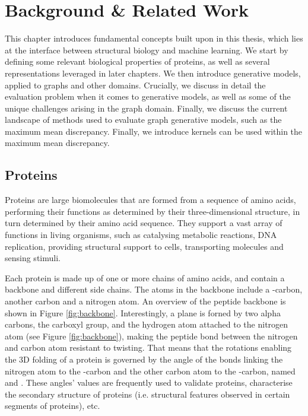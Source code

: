 
\chapter{Background \& Related Work}\label{chap:background}


This chapter introduces fundamental concepts built upon in this thesis, which
lies at the interface between structural biology and machine learning. We start
by defining some relevant biological properties of proteins, as well as several
representations leveraged in later chapters. We then introduce generative
models, applied to graphs and other domains. Crucially, we discuss in detail the
evaluation problem when it comes to generative models, as well as some of the
unique challenges arising in the graph domain. Finally, we discuss the current
landscape of methods used to evaluate graph generative models, such as the
maximum mean discrepancy. Finally, we introduce kernels can be used within the
maximum mean discrepancy.

\section{Proteins}\label{sec:proteins}

Proteins are large biomolecules that are formed from a sequence of amino acids,
performing their functions as determined by their three-dimensional structure,
in turn determined by their amino acid sequence. They support a vast array of
functions in living organisms, such as catalysing metabolic reactions, DNA
replication, providing structural support to cells, transporting molecules and
sensing stimuli.

Each protein is made up of one or more chains of amino acids, and contain a
backbone and different side chains. The atoms in the backbone include a
\textalpha{}-carbon, another carbon and a nitrogen atom. An overview of the
peptide backbone is shown in Figure \ref{fig:backbone}. Interestingly, a plane
is forned by two alpha carbons, the carboxyl group, and the hydrogen atom
attached to the nitrogen atom (see Figure \ref{fig:backbone}), making the
peptide bond between the nitrogen and carbon atom resistant to twisting. That
means that the rotations enabling the 3D folding of a protein is governed by the
angle of the bonds linking the nitrogen atom to the \textalpha{}-carbon and the
other carbon atom to the \textalpha{}-carbon, named \textphi{} and \textpsi{}.
These angles' values are frequently used to validate proteins, characterise the
secondary structure of proteins (i.e. structural features observed in certain
segments of proteins), etc.


